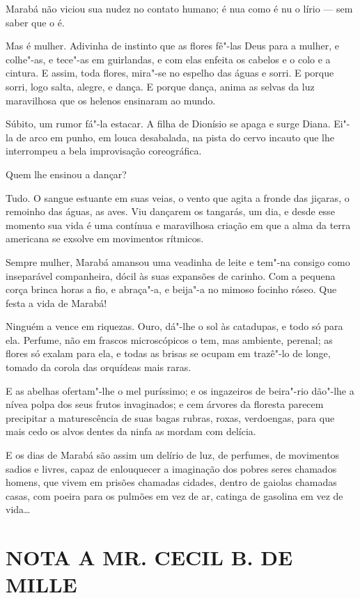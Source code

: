 Marabá não viciou sua nudez no contato humano; é nua como é nu o lírio
--- sem saber que o é.

Mas é mulher. Adivinha de instinto que as flores fê"-las Deus para a
mulher, e colhe"-as, e tece"-as em guirlandas, e com elas enfeita os
cabelos e o colo e a cintura. E assim, toda flores, mira"-se no espelho
das águas e sorri. E porque sorri, logo salta, alegre, e dança. E porque
dança, anima as selvas da luz maravilhosa que os helenos ensinaram ao
mundo.

Súbito, um rumor fá"-la estacar. A filha de Dionísio se apaga e surge
Diana. Ei"-la de arco em punho, em louca desabalada, na pista do cervo
incauto que lhe interrompeu a bela improvisação coreográfica.

Quem lhe ensinou a dançar?

Tudo. O sangue estuante em suas veias, o vento que agita a fronde das
jiçaras, o remoinho das águas, as aves. Viu dançarem os tangarás, um
dia, e desde esse momento sua vida é uma contínua e maravilhosa criação
em que a alma da terra americana se exsolve em movimentos rítmicos.

Sempre mulher, Marabá amansou uma veadinha de leite e tem"-na consigo
como inseparável companheira, dócil às suas expansões de carinho. Com a
pequena corça brinca horas a fio, e abraça"-a, e beija"-a no mimoso
focinho róseo. Que festa a vida de Marabá!

Ninguém a vence em riquezas. Ouro, dá"-lhe o sol às catadupas, e todo só
para ela. Perfume, não em frascos microscópicos o tem, mas ambiente,
perenal; as flores só exalam para ela, e todas as brisas se ocupam em
trazê"-lo de longe, tomado da corola das orquídeas mais raras.

E as abelhas ofertam"-lhe o mel puríssimo; e os ingazeiros de beira"-rio
dão"-lhe a nívea polpa dos seus frutos invaginados; e cem árvores da
floresta parecem precipitar a maturescência de suas bagas rubras, roxas,
verdoengas, para que mais cedo os alvos dentes da ninfa as mordam com
delícia.

E os dias de Marabá são assim um delírio de luz, de perfumes, de
movimentos sadios e livres, capaz de enlouquecer a imaginação dos pobres
seres chamados homens, que vivem em prisões chamadas cidades, dentro de
gaiolas chamadas casas, com poeira para os pulmões em vez de ar, catinga
de gasolina em vez de vida\ldots{}

\section*{NOTA A MR. CECIL B. DE MILLE}

